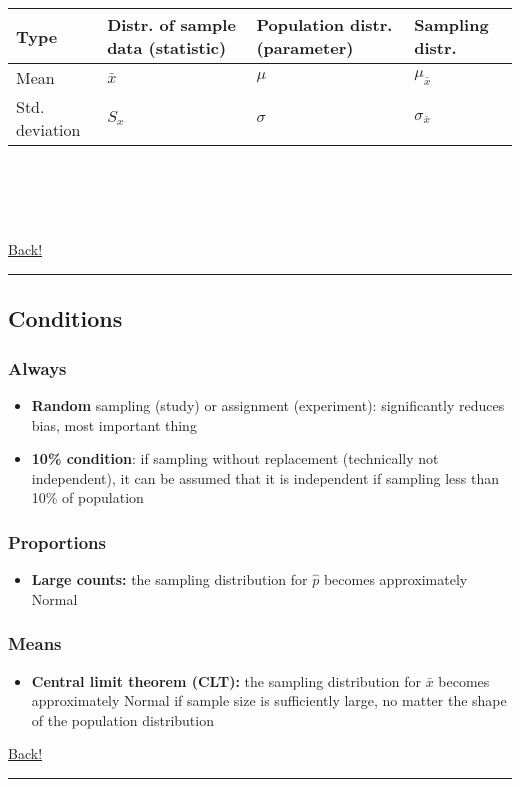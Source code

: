 \documentclass[main]{subfiles}
\begin{document}
\begin{tabular}{ | p{2.6cm} || p{2.6cm} | p{2.6cm} | p{2.6cm} | }
    \hline
    Type & Distr. of sample data (statistic) & Population distr. (parameter) & Sampling distr. \\
    \hline
    Mean & $\bar{x}$ & $\mu$ & $\mu_{\bar{x}}$ \\
    \hline
    Std. deviation & $S_x$ & $\sigma$ & $\sigma_{\bar{x}}$ \\
    \hline
\end{tabular}
\\~\\\\~\\
\noindent\hyperlink{toc}{Back!}
\newline\hrule

\subsection{Conditions}
\subsubsection{Always}
\begin{itemize}
    \item \textbf{Random} sampling (study) or assignment (experiment): significantly reduces bias, most important thing
    \item \textbf{10\% condition}: if sampling without replacement (technically not independent), it can be assumed that it is independent if sampling less than 10\% of population
\end{itemize}
\subsubsection{Proportions}
\begin{itemize}
    \item \textbf{Large counts:} the sampling distribution for $\hat{p}$ becomes approximately Normal
\end{itemize}
\subsubsection{Means}
\begin{itemize}
    \item \textbf{Central limit theorem (CLT):} the sampling distribution for $\bar{x}$ becomes approximately Normal if sample size is sufficiently large, no matter the shape of the population distribution
\end{itemize}

\noindent\hyperlink{toc}{Back!}
\newline\hrule
\end{document}
